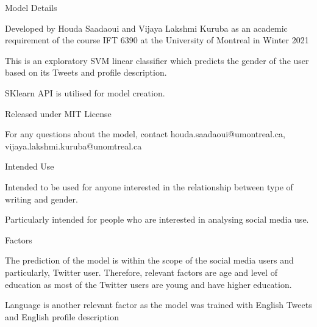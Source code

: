 \documentclass{article}
\begin{document}
 \begin{adjustwidth}{-60pt}{-30pt}
 \begin{singlespace}
 
 \begin{tcolorbox}[title=\textbf{Model Card - Tweeter Gender Classification },
     breakable, sharp corners, boxrule=0.7pt]
 
 \small{
 
 \begin{mcsection}{Model Details}
    \item Developed by Houda Saadaoui and  Vijaya Lakshmi Kuruba as an academic requirement of the course IFT 6390 at the University of Montreal in Winter 2021
     \item  This is an exploratory SVM linear classifier which predicts the gender of the user based on its Tweets and profile description.
     \item SKlearn API is utilised for model creation.
     \item Released under MIT License
     \item For any questions about the model, contact houda.saadaoui@umontreal.ca,\\vijaya.lakshmi.kuruba@unomtreal.ca 

 \end{mcsection}
 
 \begin{mcsection}{Intended Use}
     \item Intended to be used for anyone interested  in the relationship between type of writing and gender. 
     \item Particularly intended for people who are interested in analysing social media use.
  

 \end{mcsection}
 
 \begin{mcsection}{Factors}
     \item The prediction of the model is within the scope of the social media users and particularly, Twitter user. 
     Therefore, relevant factors are age and level of education as most of the Twitter users are young and have higher education.
    \item Language is another relevant factor as the model was trained with English Tweets and English profile description


\end{mcsection}}
\end{tcolorbox}
\end{singlespace}
\end{adjustwidth}
\end{document}
